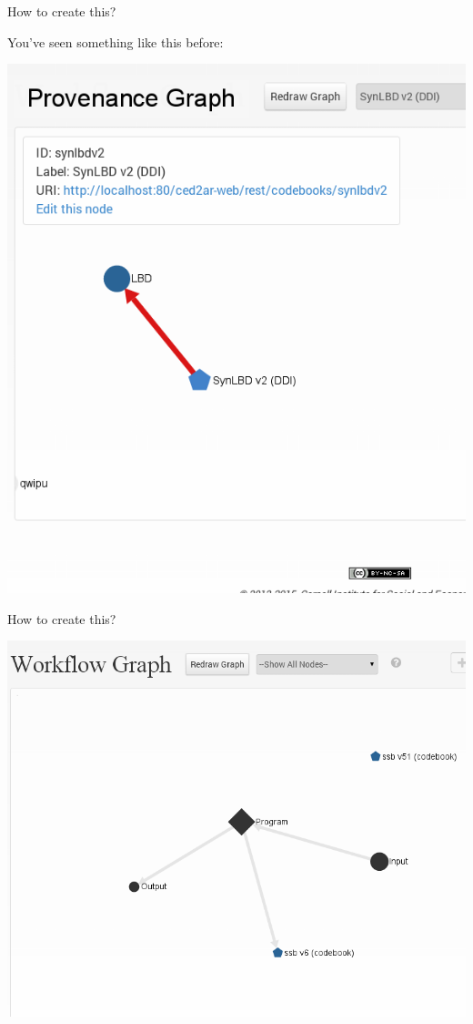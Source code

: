\begin{frame}{How to create this?}
\begin{block}{You've seen something like this before:}

\includegraphics[height=0.9\textheight]{Selection_082.png}
\end{block}

\end{frame}


\begin{frame}{How to create this?}


\includegraphics[height=0.9\textheight]{Selection_086.png}

\end{frame}



